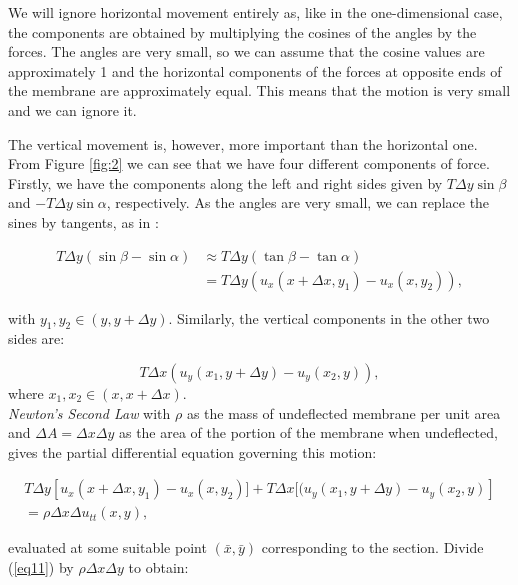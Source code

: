 \documentclass[a4paper, 12pt]{article}
\numberwithin{equation}{section}
\begin{document}
We will ignore horizontal movement entirely as, like in the one-dimensional case, the components are obtained by multiplying the cosines of 
the angles by the forces. The angles are very small, so we can assume that the cosine values are approximately 1 and the horizontal 
components of the forces at opposite ends of the membrane are approximately equal. This means that the motion is very small and we can ignore it.

The vertical movement is, however, more important than the horizontal one. From Figure \ref{fig:2} we can see that we have four different components of force.
Firstly, we have the components along the left and right sides given by $T\Delta y \sin\beta$ and $-T\Delta y\sin\alpha$, respectively. As the 
angles are very small, we can replace the sines by tangents, as in \cite{Kr}:

\begin{equation} \label{eq9}
\begin{split} 
    T\Delta y(\sin\beta - \sin\alpha) & \approx T\Delta y(\tan\beta-\tan\alpha)\\
    &= T\Delta y(u_x(x+\Delta x, y_1)-u_x(x, y_2)), 
\end{split}
\end{equation}

with $y_1, y_2 \in(y, y+\Delta y)$. Similarly, the vertical components in the other two sides are:

\begin {equation} \label{eq10}
    T\Delta x(u_y(x_1, y+\Delta y)-u_y(x_2,y)),
\end{equation}
where $x_1, x_2 \in(x, x+\Delta x)$.
\\

\emph{Newton's Second Law} with $\rho$ as the mass of undeflected membrane per unit area and $\Delta A=\Delta x\Delta y$ as the area of the portion
of the membrane when undeflected, gives the partial differential equation governing this motion:

\begin{equation} \label{eq11}
    \begin{split}
    T\Delta y\left[u_x(x+\Delta x, y_1)-u_x(x, y_2)]+T\Delta x[(u_y(x_1, y+\Delta y)-u_y(x_2,y)\right]\\
    =\rho\Delta x\Delta u_{tt}(x,y),
\end{split}
\end{equation}

evaluated at some suitable point $(\bar{x},\bar{y})$ corresponding to the section. Divide (\ref{eq11}) by $\rho\Delta x\Delta y$ to obtain:
\end{document}
